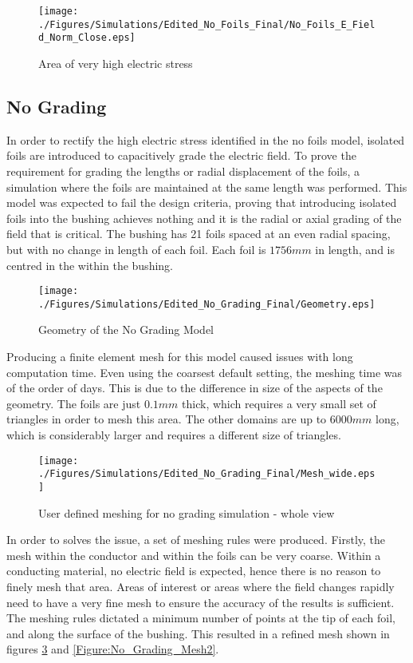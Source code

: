 \begin{figure}[!h]
   \centering
   \texttt{[image: ./Figures/Simulations/Edited\_No\_Foils\_Final/No\_Foils\_E\_Field\_Norm\_Close.eps]}
   \caption{Area of very high electric stress}
   \label{figure:problemfield}
\end{figure}

\subsection{No Grading} \label{ss:no_grading}
In order to rectify the high electric stress identified in the no foils model, isolated foils are introduced to capacitively grade the electric field.
To prove the requirement for grading the lengths or radial displacement of the foils, a simulation where the foils are maintained at the same length was performed.
This model was expected to fail the design criteria, proving that introducing isolated foils into the bushing achieves nothing and it is the radial or axial grading of the field that is critical.
The bushing has 21 foils spaced at an even radial spacing, but with no change in length of each foil.
Each foil is $1756mm$ in length, and is centred in the within the bushing. 

\begin{figure}[!h]
  \centering
    \texttt{[image: ./Figures/Simulations/Edited\_No\_Grading\_Final/Geometry.eps]} 
	\caption{Geometry of the No Grading Model}
	\label{Figure:No_Grading_Geom}
\end{figure}

Producing a finite element mesh for this model caused issues with long computation time. 
Even using the coarsest default setting, the meshing time was of the order of days.
This is due to the difference in size of the aspects of the geometry.
The foils are just $0.1mm$ thick, which requires a very small set of triangles in order to mesh this area.
The other domains are up to $6000mm$ long, which is considerably larger and requires a different size of triangles.

\begin{figure}[!h]
  \centering
    \texttt{[image: ./Figures/Simulations/Edited\_No\_Grading\_Final/Mesh\_wide.eps]} 
	\caption{User defined meshing for no grading simulation - whole view}
\label{Figure:No_Grading_Mesh1}
\end{figure}

In order to solves the issue, a set of meshing rules were produced.
Firstly, the mesh within the conductor and within the foils can be very coarse.
Within a conducting material, no electric field is expected, hence there is no reason to finely mesh that area.
Areas of interest or areas where the field changes rapidly need to have a very fine mesh to ensure the accuracy of the results is sufficient.
The meshing rules dictated a minimum number of points at the tip of each foil, and along the surface of the bushing.
This resulted in a refined mesh shown in figures \ref{Figure:No_Grading_Mesh1} and \ref{Figure:No_Grading_Mesh2}.

